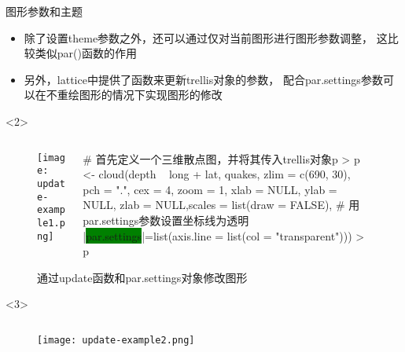 \begin{frame}[t,fragile]{\subsecname}{图形参数和主题}
\begin{itemize}
\item 除了设置theme参数之外，还可以通过仅对当前图形进行图形参数调整，
这比较类似par()函数的作用
\item 另外，lattice中提供了函数来更新trellis对象的参数，
配合par.settings参数可以在不重绘图形的情况下实现图形的修改
\end{itemize}

\begin{overlayarea}{\textwidth}{\textheight}
\begin{onlyenv}<2>
\begin{figure}
 \begin{columns}
    \begin{column}[c]{.4\textwidth}
        \texttt{[image: update-example1.png]}
    \end{column}

    \begin{column}[c]{.6\textwidth}
\begin{rcode}
# 首先定义一个三维散点图，并将其传入trellis对象p
> p <-
  cloud(depth ~ long + lat, quakes, zlim = c(690, 30), pch = ".", cex = 4, zoom = 1, xlab = NULL, ylab = NULL, zlab = NULL,scales = list(draw = FALSE),
        # 用par.settings参数设置坐标线为透明
        |\colorbox{green}{par.settings}|=list(axis.line = list(col = "transparent")))
> p
\end{rcode}
    \end{column}
  \end{columns}
  \caption{通过update函数和par.settings对象修改图形}
\end{figure}
\end{onlyenv}

\begin{onlyenv}<3>
\begin{figure}
 \begin{columns}
    \begin{column}[c]{.4\textwidth}
        \texttt{[image: update-example2.png]}
    \end{column}


\end{columns}
\end{figure}
\end{onlyenv}
\end{overlayarea}
\end{frame}
